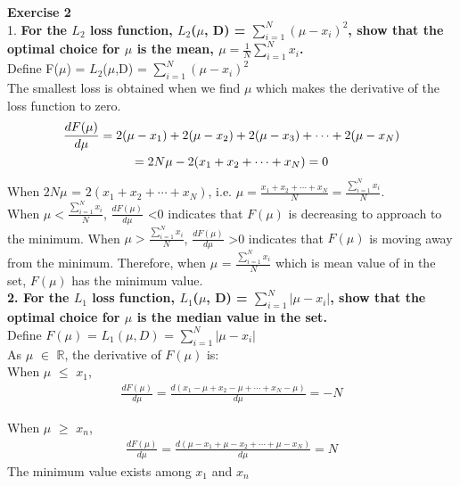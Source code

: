 \documentclass{article}
\begin{document}
\textbf{Exercise 2}\\

1. \textbf{For the $L_2$ loss function, $L_2$($\mu$, D) = $\sum_{i=1}^{N} (\mu - x_i)^2$, show that the optimal choice for $\mu$ is the mean, $\mu = \frac{1}{N} \sum_{i=1}^N x_i$.}\\

Define F($\mu$) = $L_2$($\mu$,D) = $\sum_{i=1}^{N} (\mu - x_i)^2$\\
The smallest loss is obtained when we find $\mu$ which makes the derivative of the loss function to zero.\\
\begin{gather}
\frac{dF(\mu)}{d\mu} = 2(\mu - x_1) + 2(\mu - x_2) + 2(\mu - x_3) + \cdots + 2(\mu - x_N) \notag \\
= 2N\mu - 2(x_1 + x_2 + \cdots + x_N) = 0
\end{gather}
When $2N\mu$ = $2(x_1 + x_2 + \cdots + x_N)$, i.e. $\mu = \frac{x_1 + x_2 + \cdots + x_N}{N} =  \frac{\sum_{i=1}^N x_i}{N}$.\\
When $\mu < \frac{\sum_{i=1}^N x_i}{N}$, $\frac{dF(\mu)}{d\mu}$ <0 indicates that $F(\mu)$ is decreasing to approach to the minimum. When $\mu > \frac{\sum_{i=1}^N x_i}{N} $, $\frac{dF(\mu)}{d\mu}$ >0 indicates that $F(\mu)$ is moving away from the minimum. Therefore, when $\mu$ = $\frac{\sum_{i=1}^N x_i}{N}$ which is mean value of in the set, $F(\mu)$ has the minimum value.\\

\textbf{2. For the $L_1$ loss function, $L_1$($\mu$, D) = $\sum_{i=1}^{N} |\mu - x_i|$, show that the optimal choice for $\mu$ is the median value in the set.}\\

Define $F(\mu)$ = $L_1(\mu,D)$ = $\sum_{i=1}^{N} |\mu - x_i|$ \\

As $\mu$ $\in$ $\mathbb{R}$, the derivative of $F(\mu)$ is:\\

When $\mu$ $\leq$ $x_1$,
\begin{gather}
\frac{dF(\mu)}{d\mu} = \frac{d (x_1 - \mu + x_2 - \mu + \cdots + x_N - \mu)}{d\mu} = -N 
\end{gather}

When $\mu$ $\geq$ $x_n$,
\begin{gather}
\frac{dF(\mu)}{d\mu} = \frac{d(\mu - x_1 + \mu - x_2 + \cdots + \mu - x_N)}{d\mu} = N 
\end{gather}
The minimum value exists among $x_1$ and $x_n$\\
\end{document}
